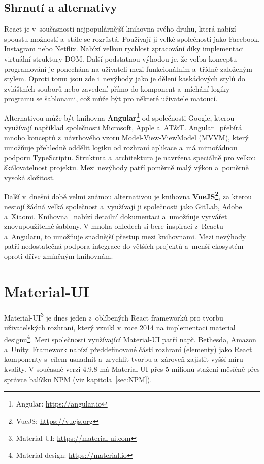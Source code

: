 \subsection*{Shrnutí a alternativy}
React je v~současnosti nejpopulárnější knihovna svého druhu, která nabízí spoustu možností a~stále se rozrůstá. Používají ji velké společnosti jako Facebook, Instagram nebo Netflix. Nabízí velkou rychlost zpracování díky implementaci virtuální struktury DOM. Další podstatnou výhodou je, že volba konceptu programování je ponechána na uživateli mezi funkcionálním a~třídně založeným stylem. Oproti tomu jsou zde i~nevýhody jako je dělení kaskádových stylů do zvláštních souborů nebo zavedení přímo do komponent a~míchání logiky programu se šablonami, což může být pro některé uživatele matoucí.

Alternativou může být knihovna \textbf{Angular\footnote{Angular: \url{https://angular.io}}} od společnosti Google, kterou využívají například společnosti Microsoft, Apple a~AT\&T. Angular~\cite{website:AngularVsReactVsVue} přebírá mnoho konceptů z~návrhového vzoru Model-View-ViewModel (MVVM), který umožňuje přehledně oddělit logiku od rozhraní aplikace a~má mimořádnou podporu TypeScriptu. Struktura a~architektura je navržena speciálně  pro velkou škálovatelnost projektu. Mezi nevýhody patří poměrně malý výkon a~poměrně vysoká složitost.

Další v~dnešní době velmi známou alternativou je knihovna \textbf{VueJS\footnote{VueJS: \url{https://vuejs.org}}}, za kterou nestojí žádná velká společnost a~využívají ji společnosti jako GitLab, Adobe a~Xiaomi. Knihovna~\cite{website:AngularVsReactVsVue} nabízí detailní dokumentaci a~umožňuje vytvářet znovupoužitelné šablony. V mnoha ohledech si bere inspiraci z~Reactu a~Angularu, to umožňuje snadnější přestup mezi knihovnami. Mezi nevýhody patří nedostatečná podpora integrace do větších projektů a~menší ekosystém oproti dříve zmíněným knihovnám.

\section{Material-UI}
Material-UI\footnote{Material-UI: \url{https://material-ui.com}} je dnes jeden z~oblíbených React frameworků pro tvorbu uživatelských rozhraní, který vznikl v~roce 2014 na implementaci material designu\footnote{Material design: \url{https://material.io}}. Mezi společnosti využívající Material-UI patří např. Bethesda, Amazon a~Unity. Framework nabízí předdefinované části rozhraní (elementy) jako React komponenty s~cílem usnadnit a~zrychlit tvorbu a~zároveň zajistit vyšší míru kvality. V současné verzi 4.9.8 má Material-UI přes 5 milionů stažení měsíčně přes správce balíčku NPM (viz kapitola~\ref{sec:NPM}).

